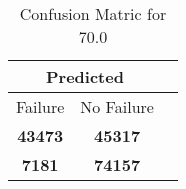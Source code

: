 \begin{table}[] 
\caption{Confusion Matric for 70.0} 
\label{Table: Prediction Accuracy-DMD70.0OnlySunEKF-ignoreReflection20.9EKF-top2-Reflection} 
\centering 
\begin{tabular} 
 {@{}ccc@{}} 
\toprule 
\multicolumn{2}{c}{\textbf{Predicted}}
 \\ \midrule 
\multicolumn{1}{|c|}{Failure} & 
\multicolumn{1}{c|}{No Failure}
 \\ \midrule 
\multicolumn{1}{|c|}{\color{green}\textbf{43473}} & 
\multicolumn{1}{c|}{\color{red}\textbf{45317}}
 \\ \midrule 
\multicolumn{1}{|c|}{\color{red}\textbf{7181}} & 
\multicolumn{1}{c|}{\color{green}\textbf{74157}}
 \\ \bottomrule 
\end{tabular} 
\end{table} 
